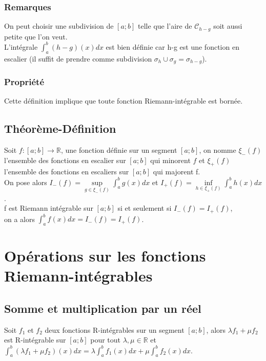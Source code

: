 \documentclass[a4paper,10pt]{book} %
\newcommand{\R}{\mathbb{R}}
\begin{document}
\subsubsection{Remarques}
On peut choisir une subdivision de $[a;b]$ telle que l'aire de $\mathcal{C}_{h-g}$ soit aussi petite que l'on veut.\\

L'intégrale $\displaystyle\int_{a}^{b}(h-g)(x)dx$ est bien définie car h-g est une fonction en escalier (il suffit de prendre comme subdivision $\sigma_h\cup \sigma_g=\sigma_{h-g}$).

\subsubsection{Propriété}
Cette définition implique que toute fonction Riemann-intégrable est bornée.

\subsection{Théorème-Définition}
Soit $f : [a;b] \rightarrow \R$, une fonction définie sur un segment $[a;b]$, on nomme $\xi_-(f)$ l'ensemble des fonctions en escalier sur $[a;b]$ qui minorent $f$ et $\xi_+(f)$ l'ensemble des fonctions en escaliers sur $[a;b]$ qui majorent f.\\

On pose alors $I_-(f)=\underset{g\in\xi_-(f)}{\sup} \displaystyle\int_{a}^{b} g(x)dx$ et $I_+(f)=\underset{h\in\xi_+(f)}{\inf} \displaystyle\int_{a}^{b} h(x)dx$.\\

f est Riemann intégrable sur $[a;b]$ si et seulement si $I_-(f)=I_+(f)$,\\
on a alors $\displaystyle\int_{a}^{b}f(x)dx=I_-(f)=I_+(f)$.

\section{Opérations sur les fonctions Riemann-intégrables}
\subsection{Somme et multiplication par un réel}
Soit $f_1$ et $f_2$ deux fonctions R-intégrables sur un segment $[a;b]$, alors $\lambda f_1+\mu f_2$ est R-intégrable sur $[a;b]$ pour tout $\lambda,\mu\in\R$ et $\displaystyle\int_a^b(\lambda f_1+\mu f_2)(x)dx=\lambda\int_{a}^{b}f_1(x)dx+\mu\int_{a}^{b}f_2(x)dx$.
\end{document}
